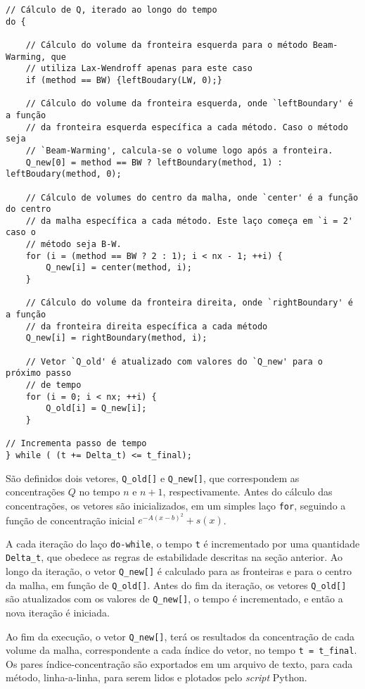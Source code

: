 \begin{Verbatim}[fontsize=\footnotesize]
// Cálculo de Q, iterado ao longo do tempo
do {

    // Cálculo do volume da fronteira esquerda para o método Beam-Warming, que
    // utiliza Lax-Wendroff apenas para este caso
    if (method == BW) {leftBoudary(LW, 0);}

    // Cálculo do volume da fronteira esquerda, onde `leftBoundary' é a função
    // da fronteira esquerda específica a cada método. Caso o método seja
    // `Beam-Warming', calcula-se o volume logo após a fronteira.
    Q_new[0] = method == BW ? leftBoundary(method, 1) : leftBoudary(method, 0);

    // Cálculo de volumes do centro da malha, onde `center' é a função do centro
    // da malha específica a cada método. Este laço começa em `i = 2' caso o
    // método seja B-W.
    for (i = (method == BW ? 2 : 1); i < nx - 1; ++i) {
        Q_new[i] = center(method, i);
    }

    // Cálculo do volume da fronteira direita, onde `rightBoundary' é a função
    // da fronteira direita específica a cada método
    Q_new[i] = rightBoundary(method, i);

    // Vetor `Q_old' é atualizado com valores do `Q_new' para o próximo passo
    // de tempo
    for (i = 0; i < nx; ++i) {
        Q_old[i] = Q_new[i];
    }

// Incrementa passo de tempo
} while ( (t += Delta_t) <= t_final);
\end{Verbatim}

São definidos dois vetores, \verb|Q_old[]| e \verb|Q_new[]|, que correspondem as
concentrações $Q$ no tempo $n$ e $n+1$, respectivamente. Antes do cálculo das
concentrações, os vetores são inicializados, em um simples laço \verb|for|,
seguindo a função de concentração inicial $e^{-A(x-b)^2} + s(x)$.

A cada iteração do laço \verb|do-while|, o tempo \verb|t| é incrementado por uma
quantidade \verb|Delta_t|, que obedece as regras de estabilidade descritas na
seção anterior. Ao longo da iteração, o vetor \verb|Q_new[]| é calculado para as
fronteiras e para o centro da malha, em função de \verb|Q_old[]|. Antes do fim
da iteração, os vetores \verb|Q_old[]| são atualizados com os valores de
\verb|Q_new[]|, o tempo é incrementado, e então a nova iteração é iniciada.

Ao fim da execução, o vetor \verb|Q_new[]|, terá os resultados da concentração
de cada volume da malha, correspondente a cada índice do vetor, no tempo
\verb|t = t_final|. Os pares índice-concentração são exportados em um arquivo
de texto, para cada método, linha-a-linha, para serem lidos e plotados pelo
\textit{script} Python.
